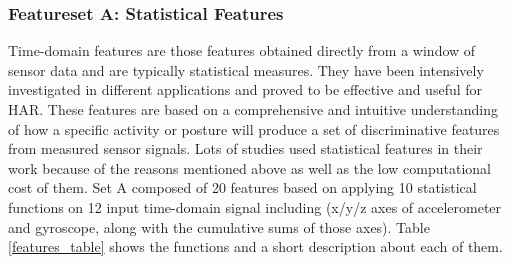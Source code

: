 \documentclass[journal,article,submit,moreauthors,pdftex]{Definitions/mdpi}
\begin{document}
\subsubsection{Featureset A: Statistical Features}
Time-domain features are those features obtained directly from a window of sensor data and are typically statistical measures. They have been intensively investigated in different applications and proved to be effective and useful for HAR. These features are based on a comprehensive and intuitive understanding of how a specific activity or posture will produce a set of discriminative features from measured sensor signals. Lots of studies used statistical features in their work because of the reasons mentioned above as well as the low computational cost of them. Set A composed of 20 features based on applying 10 statistical functions on 12 input time-domain signal including (x/y/z axes of accelerometer and gyroscope, along with the cumulative sums of those axes). Table \ref{features_table} shows the functions and a short description about each of them.
\end{document}
